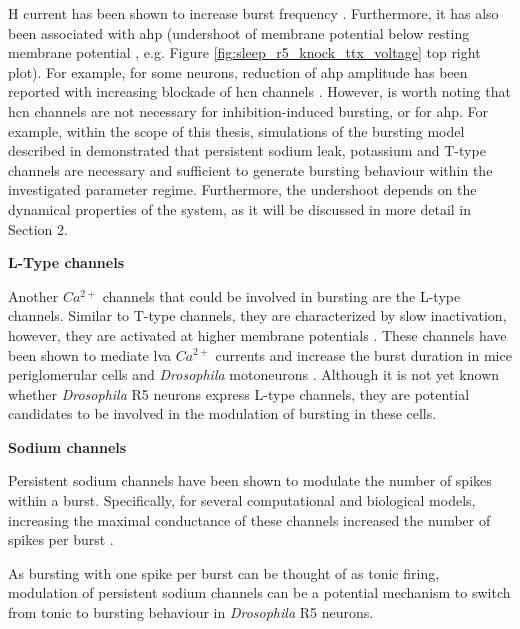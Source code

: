 \documentclass[../main.tex]{subfiles}
\begin{document}
H current has been shown to increase burst frequency \parencite{liuMultipleConductancesCooperatively2008,mccormickModelElectrophysiologicalProperties1992}.
Furthermore, it has also been associated with \gls{ahp} (undershoot of membrane potential below resting membrane potential \parencite{mccormickModelElectrophysiologicalProperties1992}, e.g. Figure \ref{fig:sleep_r5_knock_ttx_voltage} top right plot). For example, for some neurons, reduction of \gls{ahp} amplitude has been reported with increasing blockade of \gls{hcn} channels \parencite{oswaldIHCurrentGenerates2009,boninHyperpolarizationActivatedCurrentIh2013}.
However, is worth noting that \gls{hcn} channels are not necessary for inhibition-induced bursting,
or for \gls{ahp}. For example, within the scope of this thesis, simulations of the bursting model described in \parencite{wangMultipleDynamicalModes1994}
demonstrated that persistent sodium leak, potassium and T-type channels are necessary and sufficient to generate bursting behaviour within the investigated parameter regime.
Furthermore, the undershoot depends on the dynamical properties of the system, as it will be discussed in more detail in Section 2. %

\noindent\textbf{L-Type channels}

Another $Ca^{2+}$ channels that could be involved in bursting are the L-type channels. Similar to T-type channels, they are characterized by slow inactivation, however, they are activated at higher membrane potentials \parencite{liuMultipleConductancesCooperatively2008}.
These channels have been shown to mediate \gls{lva} $Ca^{2+}$ currents and increase the burst duration in mice periglomerular cells \parencite{liuMultipleConductancesCooperatively2008} and \textit{Drosophila} motoneurons \parencite{kadasDendriticAxonalLType2017}.
Although it is not yet known whether \textit{Drosophila} R5 neurons express L-type channels, they are potential candidates to be involved in the modulation of bursting in these cells.


\noindent\textbf{Sodium channels}

Persistent sodium channels have been shown to modulate the number of spikes within a burst. Specifically, for several computational and biological models, increasing the maximal conductance of these channels increased the number of spikes per burst \parencite{liuMultipleConductancesCooperatively2008,golombContributionPersistentNa2006}.

As bursting with one spike per burst can be thought of as tonic firing, modulation of persistent sodium channels can be a potential mechanism to switch from tonic to bursting behaviour in \textit{Drosophila} R5 neurons.
\end{document}
